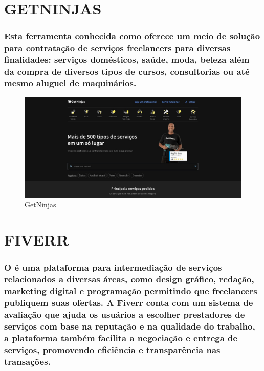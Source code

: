 \section{GETNINJAS}
\subsubsection{Esta ferramenta conhecida como \cite{GetNinjas} oferece um meio de solução para contratação de serviços freelancers para diversas finalidades: serviços domésticos, saúde, moda, beleza além da compra de diversos tipos de cursos, consultorias ou até mesmo aluguel de maquinários.}

\begin{figure}
\centering
\caption{GetNinjas}
\label{fig:GetNinjas}
\includegraphics[scale=0.5]{Illustrations/GetNinjas.jpg}
\end{figure}

\section{FIVERR}
\subsubsection{O \cite{Fiverr} é uma plataforma para intermediação de serviços relacionados a diversas áreas, como design gráfico, redação, marketing digital e programação permitindo que freelancers publiquem suas ofertas. A Fiverr conta com um sistema de avaliação que ajuda os usuários a escolher prestadores de serviços com base na reputação e na qualidade do trabalho, a plataforma também facilita a negociação e entrega de serviços, promovendo eficiência e transparência nas transações.}

